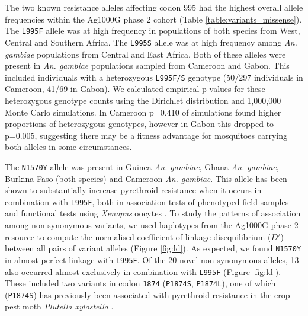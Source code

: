 \documentclass[a4paper,11pt,abstracton,hidelinks]{scrartcl}
\begin{document}
The two known resistance alleles affecting codon 995 had the highest overall allele frequencies within the Ag1000G phase 2 cohort (Table \ref{table:variants_missense}).
%
The \texttt{L995F} allele was at high frequency in populations of both species from West, Central and Southern Africa.
%
The \texttt{L995S} allele was at high frequency among \textit{An. gambiae} populations from Central and East Africa.
%
Both of these alleles were present in \textit{An. gambiae} populations sampled from Cameroon and Gabon.
%
This included individuals with a heterozygous \texttt{L995F/S} genotype (50/297 individuals in Cameroon, 41/69 in Gabon).
%
We calculated empirical p-values for these heterozygous genotype counts using the Dirichlet distribution and 1,000,000 Monte Carlo simulations.
%
In Cameroon p=0.410 of simulations found higher proportions of heterozygous genotypes, however in Gabon this dropped to p=0.005, suggesting there may be a fitness advantage for mosquitoes carrying both alleles in some circumstances.
%


%
The \texttt{N1570Y} allele was present in Guinea \textit{An. gambiae}, Ghana \textit{An. gambiae}, Burkina Faso (both species) and Cameroon \textit{An. gambiae}.
%
This allele has been shown to substantially increase pyrethroid resistance when it occurs in combination with \texttt{L995F}, both in association tests of phenotyped field samples \cite{Jones2012} and functional tests using \textit{Xenopus} oocytes \cite{Wang2015}.
%
To study the patterns of association among non-synonymous variants, we used haplotypes from the Ag1000G phase 2 resource to compute the normalised coefficient of linkage disequilibrium ($D'$) between all pairs of variant alleles (Figure \ref{fig:ld}).
%
As expected, we found \texttt{N1570Y} in almost perfect linkage with \texttt{L995F}.
%
Of the 20 novel non-synonymous alleles, 13 also occurred almost exclusively in combination with \texttt{L995F} (Figure \ref{fig:ld}).
%
These included two variants in codon \texttt{1874} (\texttt{P1874S}, \texttt{P1874L}), one of which (\texttt{P1874S}) has previously been associated with pyrethroid resistance in the crop pest moth \textit{Plutella xylostella} \cite{Sonoda2008}.
\end{document}
